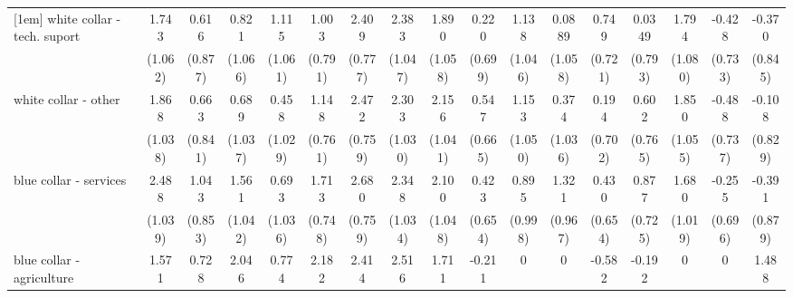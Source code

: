 {\begin{tabular}{l*{16}{c}}
[1em]
white collar - tech. suport&       1.743         &       0.616         &       0.821         &       1.115         &       1.003         &       2.409\sym{**} &       2.383\sym{*}  &       1.890         &       0.220         &       1.138         &      0.0889         &       0.749         &      0.0349         &       1.794         &      -0.428         &      -0.370         \\
                    &     (1.062)         &     (0.877)         &     (1.066)         &     (1.061)         &     (0.791)         &     (0.777)         &     (1.047)         &     (1.058)         &     (0.699)         &     (1.046)         &     (1.058)         &     (0.721)         &     (0.793)         &     (1.080)         &     (0.733)         &     (0.845)         \\
[1em]
white collar - other&       1.868         &       0.663         &       0.689         &       0.458         &       1.148         &       2.472\sym{**} &       2.303\sym{*}  &       2.156\sym{*}  &       0.547         &       1.153         &       0.374         &       0.194         &       0.602         &       1.850         &      -0.488         &      -0.108         \\
                    &     (1.038)         &     (0.841)         &     (1.037)         &     (1.029)         &     (0.761)         &     (0.759)         &     (1.030)         &     (1.041)         &     (0.665)         &     (1.050)         &     (1.036)         &     (0.702)         &     (0.765)         &     (1.055)         &     (0.737)         &     (0.829)         \\
[1em]
blue collar - services&       2.488\sym{*}  &       1.043         &       1.561         &       0.693         &       1.713\sym{*}  &       2.680\sym{***}&       2.348\sym{*}  &       2.100\sym{*}  &       0.423         &       0.895         &       1.321         &       0.430         &       0.877         &       1.680         &      -0.255         &      -0.391         \\
                    &     (1.039)         &     (0.853)         &     (1.042)         &     (1.036)         &     (0.748)         &     (0.759)         &     (1.034)         &     (1.048)         &     (0.654)         &     (0.998)         &     (0.967)         &     (0.654)         &     (0.725)         &     (1.019)         &     (0.696)         &     (0.879)         \\
[1em]
blue collar - agriculture&       1.571         &       0.728         &       2.046         &       0.774         &       2.182         &       2.414\sym{*}  &       2.516         &       1.711         &      -0.211         &           0         &           0         &      -0.582         &      -0.192         &           0         &           0         &       1.488         \\

\end{tabular}}
